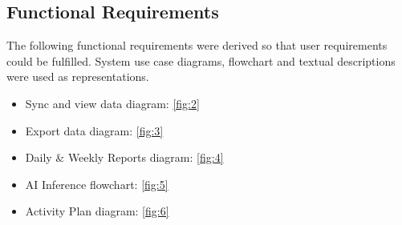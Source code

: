 \subsection{Functional Requirements}
The following functional requirements were derived so that user requirements could be fulfilled. System use case diagrams, flowchart and textual descriptions were used as representations.
\begin{itemize}
    \item Sync and view data diagram: \ref{fig:2}
    \item Export data diagram: \ref{fig:3}
    \item Daily \& Weekly Reports diagram: \ref{fig:4}
    \item AI Inference flowchart: \ref{fig:5}
    \item Activity Plan diagram: \ref{fig:6}
\end{itemize}
